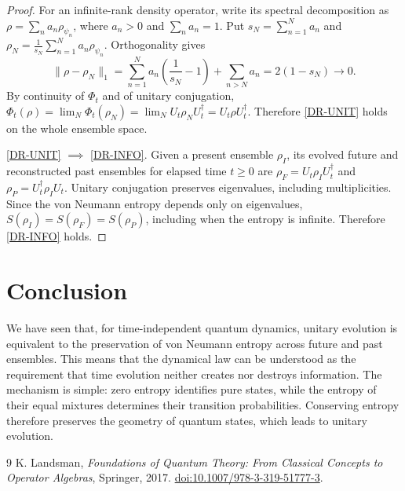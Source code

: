 \documentclass{techbrief}
\begin{document}
\begin{proof}
	For an infinite-rank density operator, write its spectral decomposition as $\rho=\sum_n a_n\rho_{\psi_n}$, where $a_n>0$ and $\sum_n a_n=1$. Put $s_N=\sum_{n=1}^N a_n$ and $\rho_N=\frac{1}{s_N}\sum_{n=1}^N a_n\rho_{\psi_n}$. Orthogonality gives
	\begin{equation*}
		\|\rho-\rho_N\|_1=\sum_{n=1}^N a_n\left(\frac{1}{s_N}-1\right)+\sum_{n>N}a_n=2(1-s_N)\longrightarrow0.
	\end{equation*}
	By continuity of $\Phi_t$ and of unitary conjugation, $\Phi_t(\rho)=\lim_N\Phi_t(\rho_N)=\lim_N U_t\rho_N U_t^\dagger=U_t\rho U_t^\dagger$. Therefore \ref{DR-UNIT} holds on the whole ensemble space.

	\ref{DR-UNIT} $\implies$ \ref{DR-INFO}. Given a present ensemble $\rho_I$, its evolved future and reconstructed past ensembles for elapsed time $t\geq0$ are $\rho_F=U_t\rho_IU_t^\dagger$ and $\rho_P=U_t^\dagger\rho_IU_t$. Unitary conjugation preserves eigenvalues, including multiplicities. Since the von Neumann entropy depends only on eigenvalues, $S(\rho_I)=S(\rho_F)=S(\rho_P)$, including when the entropy is infinite. Therefore \ref{DR-INFO} holds.
\end{proof}

\section{Conclusion}

We have seen that, for time-independent quantum dynamics, unitary evolution is equivalent to the preservation of von Neumann entropy across future and past ensembles. This means that the dynamical law can be understood as the requirement that time evolution neither creates nor destroys information. The mechanism is simple: zero entropy identifies pure states, while the entropy of their equal mixtures determines their transition probabilities. Conserving entropy therefore preserves the geometry of quantum states, which leads to unitary evolution.

\begin{thebibliography}{9}
	K. Landsman, \emph{Foundations of Quantum Theory: From Classical Concepts to Operator Algebras}, Springer, 2017.
	\href{https://doi.org/10.1007/978-3-319-51777-3}{doi:10.1007/978-3-319-51777-3}.
\end{thebibliography}
\end{document}
